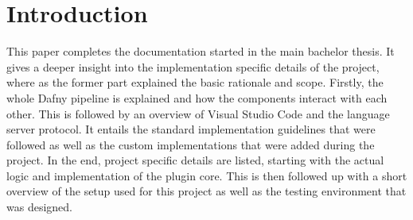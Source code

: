 \section{Introduction}
This paper completes the documentation started in the main bachelor thesis. It gives a deeper insight into the implementation specific details of the project, where as the former part explained the basic rationale and scope. \newline
Firstly, the whole Dafny pipeline is explained and how the components interact with each other. This is followed by an overview of Visual Studio Code and the language server protocol. It entails the standard implementation guidelines that were followed as well as the custom implementations that were added during the project.\newline
In the end, project specific details are listed, starting with the actual logic and implementation of the plugin core. This is then followed up with a short overview of the setup used for this project as well as the testing environment that was designed.   
